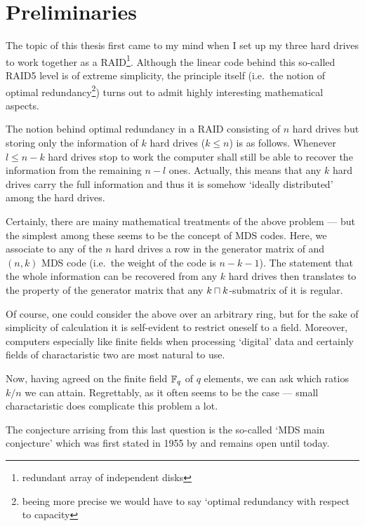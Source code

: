 \section*{Preliminaries}

The topic of this thesis first came to my mind when I set up my three hard drives to work together as a RAID\footnote{redundant array of independent disks}. Although the linear code behind this so-called RAID5 level is of extreme simplicity, the principle itself (i.e.~the notion of optimal redundancy\footnote{beeing more precise we would have to say `optimal redundancy with respect to capacity}) turns out to admit highly interesting mathematical aspects.

The notion behind optimal redundancy in a RAID consisting of $n$ hard drives but storing only the information of $k$ hard drives ($k\leq n$) is as follows. Whenever $l\leq n-k$ hard drives stop to work the computer shall still be able to recover the information from the remaining $n-l$ ones. Actually, this means that any $k$ hard drives carry the full information and thus it is somehow `ideally distributed' among the hard drives.

Certainly, there are mainy mathematical treatments of the above problem --- but the simplest among these seems to be the concept of MDS codes. Here, we associate to any of the $n$ hard drives a row in the generator matrix of and $(n,k)$ MDS code (i.e.~the  weight of the code is $n-k-1$). The statement that the whole information can be recovered from any $k$ hard drives then translates to the property of the generator matrix that any $k\setprod k$-submatrix of it is regular.

Of course, one could consider the above over an arbitrary ring, but for the sake of simplicity of calculation it is self-evident to restrict oneself to a field. Moreover, computers especially like finite fields when processing `digital' data and certainly fields of charactaristic two are most natural to use.

Now, having agreed on the finite field $\mathbb{F}_{q}$ of $q$ elements, we can ask which ratios $k/n$ we can attain. 
Regrettably, as it often seems to be the case --- small charactaristic does complicate this problem a lot.

The conjecture arrising from this last question is the so-called `MDS main conjecture' which was first stated in 1955 by  and remains open until today.

